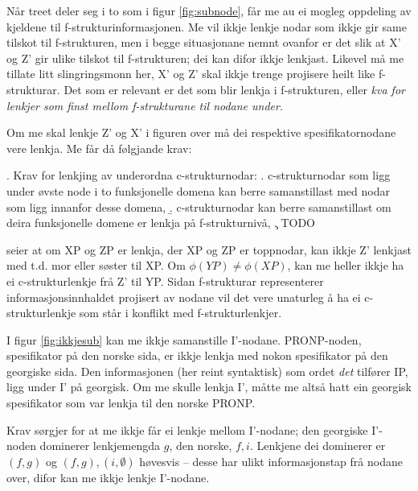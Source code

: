 \documentclass[11pt,a4paper,oneside,draft]{book}
\begin{document}
Når treet deler seg i to som i figur \ref{fig:subnode}, får me au ei
mogleg oppdeling av kjeldene til f-strukturinformasjonen. Me vil ikkje
lenkje nodar som ikkje gir same tilskot til f-strukturen, men i begge
situasjonane nemnt ovanfor er det slik at X' og Z' gir ulike tilskot
til f-strukturen; dei kan difor ikkje lenkjast. Likevel må me tillate
litt slingringsmonn her, X' og Z' skal ikkje trenge projisere heilt
like f-strukturar. Det som er relevant er det som blir lenkja i
f-strukturen, eller \emph{kva for lenkjer som finst mellom f-strukturane til nodane under}.

Om me skal lenkje Z' og X' i figuren over må dei respektive
spesifikatornodane vere lenkja. Me får då følgjande krav:


\ex. \label{subnodekrav} Krav for lenkjing av underordna
c-strukturnodar:
\a. \label{subnodekrav-innan-domene} c-strukturnodar som ligg under øvste node i to funksjonelle
    domena kan berre samanstillast med nodar som ligg innanfor desse
    domena,
\b. \label{subnodekrav-f-lenkja} c-strukturnodar kan berre samanstillast om deira funksjonelle
    domene er lenkja på f-strukturnivå,
\c. \label{subnodekrav-infotap} TODO

\Last[a] seier at om XP og ZP er lenkja, der XP og ZP er toppnodar,
kan ikkje Z' lenkjast med t.d. mor eller søster til XP. Om $\phi(YP)
\neq \phi(XP)$, kan me heller ikkje ha ei c-strukturlenkje frå Z' til
YP. Sidan f-strukturar representerer informasjonsinnhaldet projisert
av nodane vil det vere unaturleg å ha ei c-strukturlenkje som står i
konflikt med f-strukturlenkjer.


I figur \ref{fig:ikkjesub} kan me ikkje samanstille
I'-nodane. PRONP-noden, spesifikator på den norske sida, er ikkje
lenkja med nokon spesifikator på den georgiske sida. Den informasjonen
(her reint syntaktisk) som ordet \emph{det} tilfører IP, ligg under I' på
georgisk. Om me skulle lenkja I', måtte me altså hatt ein georgisk
spesifikator som var lenkja til den norske PRONP.

Krav \Last[c] sørgjer for at me ikkje får ei lenkje mellom I'-nodane;
den georgiske I'-noden dominerer lenkjemengda ${g}$, den norske,
${f,i}$. Lenkjene dei dominerer er ${(f,g)}$ og
${(f,g),(i,\emptyset)}$ høvesvis -- desse har ulikt informasjonstap
frå nodane over, difor kan me ikkje lenkje I'-nodane.
\end{document}
